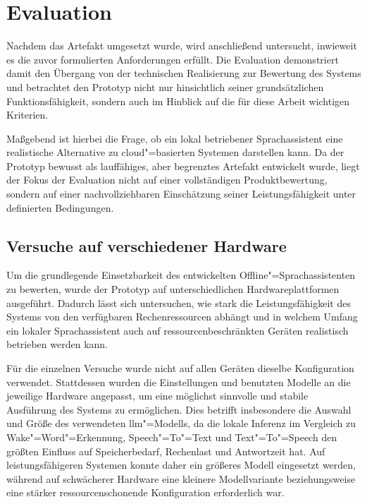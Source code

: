 \chapter{Evaluation}
\label{chap:Evaluation}
Nachdem das Artefakt umgesetzt wurde, wird anschließend untersucht, inwieweit es die zuvor formulierten Anforderungen erfüllt. Die Evaluation demonstriert damit den Übergang von der technischen Realisierung zur Bewertung des Systems und betrachtet den Prototyp nicht nur hinsichtlich seiner grundsätzlichen Funktionsfähigkeit, sondern auch im Hinblick auf die für diese Arbeit wichtigen Kriterien.

Maßgebend ist hierbei die Frage, ob ein lokal betriebener Sprachassistent eine realistische Alternative zu cloud"=basierten Systemen darstellen kann. Da der Prototyp bewusst als lauffähiges, aber begrenztes Artefakt entwickelt wurde, liegt der Fokus der Evaluation nicht auf einer vollständigen Produktbewertung, sondern auf einer nachvollziehbaren Einschätzung seiner Leistungsfähigkeit unter definierten Bedingungen.


\section{Versuche auf verschiedener Hardware}
\label{sec:Versuche_auf_verschiedener_Hardware}
Um die grundlegende Einsetzbarkeit des entwickelten Offline"=Sprachassistenten zu bewerten, wurde der Prototyp auf unterschiedlichen Hardwareplattformen ausgeführt. Dadurch lässt sich untersuchen, wie stark die Leistungsfähigkeit des Systems von den verfügbaren Rechenressourcen abhängt und in welchem Umfang ein lokaler Sprachassistent auch auf ressourcenbeschränkten Geräten realistisch betrieben werden kann.

Für die einzelnen Versuche wurde nicht auf allen Geräten dieselbe Konfiguration verwendet. Stattdessen wurden die Einstellungen und benutzten Modelle an die jeweilige Hardware angepasst, um eine möglichst sinnvolle und stabile Ausführung des Systems zu ermöglichen. Dies betrifft insbesondere die Auswahl und Größe des verwendeten \gls{llm}"=Modells, da die lokale Inferenz im Vergleich zu Wake"=Word"=Erkennung, Speech"=To"=Text und Text"=To"=Speech den größten Einfluss auf Speicherbedarf, Rechenlast und Antwortzeit hat. Auf leistungsfähigeren Systemen konnte daher ein größeres Modell eingesetzt werden, während auf schwächerer Hardware eine kleinere Modellvariante beziehungsweise eine stärker ressourcenschonende Konfiguration erforderlich war.

